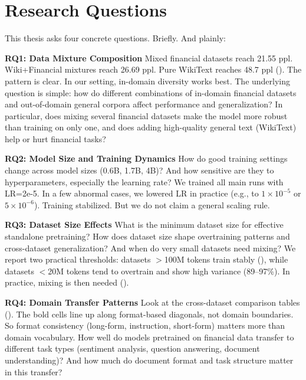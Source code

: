 \section{Research Questions}

This thesis asks four concrete questions. Briefly. And plainly:

\textbf{RQ1: Data Mixture Composition}
Mixed financial datasets reach 21.55 ppl. Wiki+Financial mixtures reach 26.69 ppl. Pure WikiText reaches 48.7 ppl (). The pattern is clear. In our setting, in-domain diversity works best. The underlying question is simple: how do different combinations of in-domain financial datasets and out-of-domain general corpora affect performance and generalization? In particular, does mixing several financial datasets make the model more robust than training on only one, and does adding high-quality general text (WikiText) help or hurt financial tasks?

\textbf{RQ2: Model Size and Training Dynamics}
How do good training settings change across model sizes (0.6B, 1.7B, 4B)? And how sensitive are they to hyperparameters, especially the learning rate? We trained all main runs with LR=2e-5. In a few abnormal cases, we lowered LR in practice (e.g., to $1\times10^{-5}$ or $5\times10^{-6}$). Training stabilized. But we do not claim a general scaling rule.

\textbf{RQ3: Dataset Size Effects}
What is the minimum dataset size for effective standalone pretraining? How does dataset size shape overtraining patterns and cross-dataset generalization? And when do very small datasets need mixing? We report two practical thresholds: datasets $>$100M tokens train stably (), while datasets $<$20M tokens tend to overtrain and show high variance (89--97\%). In practice, mixing is then needed ().

\textbf{RQ4: Domain Transfer Patterns}
Look at the cross-dataset comparison tables (). The bold cells line up along format-based diagonals, not domain boundaries. So format consistency (long-form, instruction, short-form) matters more than domain vocabulary. How well do models pretrained on financial data transfer to different task types (sentiment analysis, question answering, document understanding)? And how much do document format and task structure matter in this transfer?

